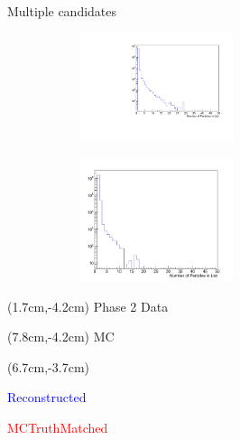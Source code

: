 \documentclass[10pt]{beamer}
\begin{document}
{\begin{frame}{Multiple candidates}
	
	
		\begin{figure}
		\begin{subfigure}{.5\textwidth}
			\centering
			\includegraphics[width=4.5cm]{Plots/NumVpho}
			
			\label{fig:sub1}
		\end{subfigure}%
		\begin{subfigure}{.5\textwidth}
			\centering
			\includegraphics[width=4.5cm]{Plots/NumVphoMC}
			
			\label{fig:sub2}
		\end{subfigure}
		
		\label{fig:test}
	\end{figure}


\begin{textblock*}{\textwidth}(1.7cm,-4.2cm)
	Phase 2 Data
\end{textblock*}	


\begin{textblock*}{\textwidth}(7.8cm,-4.2cm)
	MC
\end{textblock*}

\begin{textblock*}{\textwidth}(6.7cm,-3.7cm)
	\begin{itemize}
	{\small	\item \textcolor{blue}{Reconstructed}}
	{\small	\item \textcolor{red}{MCTruthMatched}}
	\end{itemize}
\end{textblock*}
	
\end{frame}



}
\end{document}
